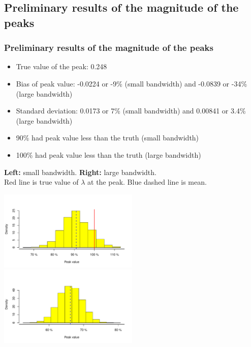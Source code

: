 \documentclass{beamer}
\theoremstyle{definition}
\begin{document}
\subsection{Preliminary results of the magnitude of the peaks}
\begin{frame}\frametitle{Preliminary results of the magnitude of the peaks}
    \footnotesize
    \begin{itemize}
        \item True value of the peak: 0.248
        \item Bias of peak value: -0.0224 or -9\% (small bandwidth) and -0.0839 or -34\% (large bandwidth)
        \item Standard deviation: 0.0173 or 7\% (small bandwidth) and 0.00841 or 3.4\% (large bandwidth)
        \item 90\% had peak value \alert{less than} the truth (small bandwidth)
        \item 100\% had peak value \alert{less than} the truth (large bandwidth)
    \end{itemize}
    \begin{example}{\tiny{\textbf{Left:} small bandwidth. \textbf{Right:} large bandwidth. \\
    {\color{red}Red} line is true value of $\lambda$ at the peak. {\color{blue}Blue dashed} line is mean.}}
    \centerline{
        \label{fig:peaks-values-hist}
        \centering
        \includegraphics[width=0.5\textwidth]{peaks-hist-values-undersmooth}
        \includegraphics[width=0.5\textwidth]{peaks-hist-values-oversmooth}
     }
    \end{example}
\end{frame}

\end{document}
